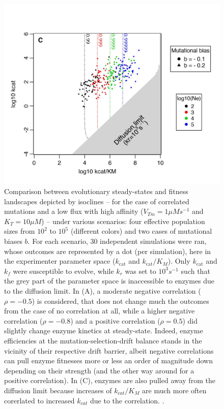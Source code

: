 \begin{figure}[!p]
\begin{center}
\begin{minipage}[c]{0.6\linewidth}
\includegraphics[scale=0.675,trim=0cm 0cm 0cm 0cm,clip]{pics/SM-Enzymes/2DFitLandscape_Evo_Results_lowF_withbias_PosMutCorr.jpeg}
\end{minipage} \hfill
\begin{minipage}[c]{0.375\linewidth}
\caption{Comparison between evolutionary steady-states and fitness landscapes depicted by isoclines -- for the case of correlated mutations and a low flux with high affinity ($V_{Tm}=1\mu Ms^{-1}$ and $K_T=10\mu M$) -- under various scenarios: four effective population sizes from $10^2$ to $10^5$ (different colors) and two cases of mutational biases %
$b$. For each scenario, 30 independent simulations were ran, whose outcomes are represented by a dot (per simulation), here in the experimenter parameter space ($k_\text{cat}$ and $k_\text{cat}/K_M$). Only $k_\text{cat}$ and $k_f$ were susceptible to evolve, while $k_r$ was set to $10^3s^{-1}$ such that the grey part of the parameter space is inaccessible to enzymes due to the diffusion limit. In (A), a moderate negative correlation ($\rho=-0.5$) is considered, that does not change much the outcomes from the case of no correlation at all, while a higher negative correlation ($\rho=-0.8$) and a positive correlation ($\rho=0.5$) did slightly change enzyme kinetics at steady-state. Indeed, enzyme efficiencies at the mutation-selection-drift balance stands in the vicinity of their respective drift barrier, albeit negative correlations can pull enzyme fitnesses more or less an order of magnitude down depending on their strength (and the other way around for a positive correlation). In (C), enzymes are also pulled away from the diffusion limit because increases of $k_{cat}/K_M$ are much more often corerlated to increased $k_{cat}$ due to the correlation.
.}
\label{fig7a-ann}
\end{minipage}
\end{center}
\end{figure}

